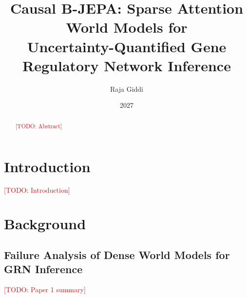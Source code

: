 \documentclass[11pt]{article}
\title{Causal B-JEPA: Sparse Attention World Models for\\
       Uncertainty-Quantified Gene Regulatory Network Inference}
\author{Raja Giddi}
\date{2027}
\newcommand{\todo}[1]{\textcolor{red}{[TODO: #1]}}
\begin{document}
\maketitle

\begin{abstract}
\todo{Abstract}
\end{abstract}

\section{Introduction}
%
%
%
\todo{Introduction}

\section{Background}

\subsection{Failure Analysis of Dense World Models for GRN Inference}
\todo{Paper 1 summary}
\end{document}
